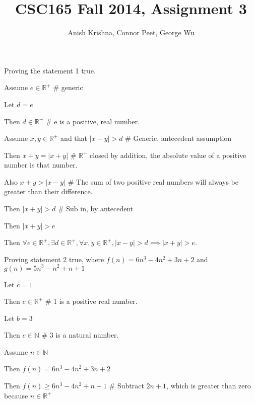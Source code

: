 \documentclass{article}
\title{CSC165 Fall 2014, Assignment 3}
\author{Anish Krishna, Connor Peet, George Wu}
\begin{document}
\maketitle


\begin{enumerate}
\item Proving the statement 1 true.
    \begin{description}
    \item Assume $e \in \mathbb{R}^+$ \# generic
    		\begin{description}
    		\item Let $d = e$
    		\item Then $d \in \mathbb{R}^+$ \# e is a positive, real number.
    		\item Assume $x, y \in \mathbb{R}^+$ and that $|x - y| > d$ \# Generic, antecedent assumption
    			\begin{description}
    			\item Then $x + y = |x + y|$ \# $\mathbb{R}^+$ closed by addition, the absolute value of a positive number is that number.
    			\item Also $x + y > |x - y|$ \# The sum of two positive real numbers will always be greater than their difference.
    			\item Then $|x + y| > d$ \# Sub in, by antecedent
    			\item Then $|x + y| > e$
    			\end{description}
    		\end{description}
    \item Then $\forall e \in \mathbb{R}^+, \exists d \in \mathbb{R}^+, \forall x, y \in \mathbb{R}^+, |x - y| > d \implies |x + y| > e$.
    \end{description}
\item Proving statement 2 true, where $f(n) = 6n^3 - 4n^2 + 3n + 2$ and $g(n) = 5n^3 - n^2 + n + 1$
	\begin{description}
	\item Let $c = 1$
	\item Then $c \in \mathbb{R}^+$ \# 1 is a positive real number.
	\item Let $b = 3$
	\item Then $c \in \mathbb{N}$ \# 3 is a natural number.
	\item Assume $n \in \mathbb{N}$
		\begin{description}
		\item Then $f(n) = 6n^3 - 4n^2 + 3n + 2$
		\item Then $f(n) \geq 6n^3 - 4n^2 + n + 1$ \# Subtract $2n + 1$, which is greater than zero because $n \in \mathbb{R}^+$

\end{description}
\end{description}
\end{enumerate}
\end{document}
